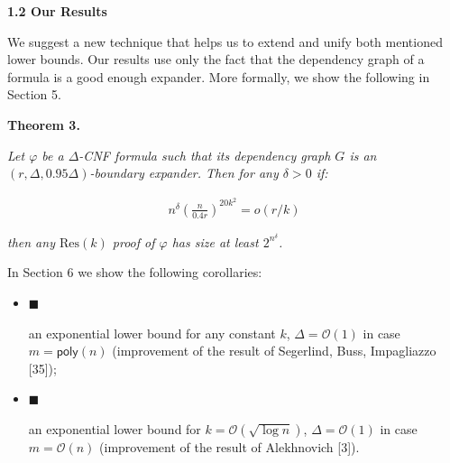 \documentclass[10pt,a4paper]{article}
\begin{document}
\par\medskip\noindent\textbf{
1.2 Our Results}\par




We suggest a new technique that helps us to extend and unify both mentioned lower bounds. Our results
use only the fact that the dependency graph of a formula is a good enough expander. More formally, we
show the following in Section 5.\par






\par\medskip\noindent\textbf{
\textbf{Theorem 3}\textbf{.}
}\par



\emph{Let $\varphi$ be a $\Delta$-CNF formula such that its dependency graph $G$ is an $(r,\Delta,0.95\Delta)$-boundary expander. Then for any $\delta>0$ if:}\par


\[\begin{gathered}
n^{\delta}\left(\frac{n}{0.4r}\right)^{20k^{2}}=o(r/k)
\end{gathered}\]


\emph{then any $\mathrm{Res}(k)$ proof of $\varphi$ has size at least $2^{n^{\delta}}$.}\par







In Section 6 we show the following corollaries:\par


\begin{itemize}


\item[] 
$\blacksquare$ 


an exponential lower bound for any constant $k$, $\Delta=\mathcal{O}\left(1\right)$ in case $m={\mathsf{poly}}(n)$
(improvement of the result of Segerlind, Buss, Impagliazzo [35]);\par





\item[] 
$\blacksquare$ 


an exponential lower bound for $k=\mathcal{O}\left(\sqrt{\log n}\right)$, $\Delta=\mathcal{O}\left(1\right)$ in case $m=\mathcal{O}\left(n\right)$ (improvement of the result of Alekhnovich [3]).\par





\end{itemize}
\end{document}
